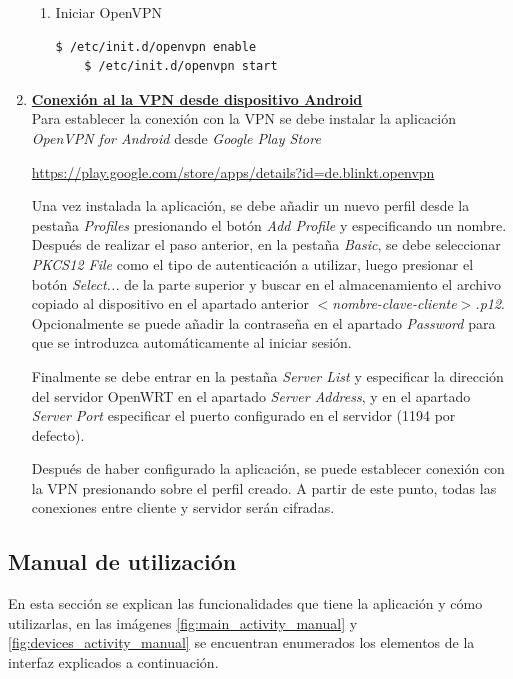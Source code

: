 \documentclass[12pt]{article}
\begin{document}
\begin{enumerate}
\begin{enumerate}
                        \item Iniciar OpenVPN
                        \begin{lstlisting}[language=bash]
    $ /etc/init.d/openvpn enable
    $ /etc/init.d/openvpn start
                        \end{lstlisting}
                    \end{enumerate}

                \item \textbf{\underline{Conexión al la VPN desde dispositivo Android}} \\
                Para establecer la conexión con la VPN se debe instalar la aplicación \textit{OpenVPN for Android} desde \textit{Google Play Store}
                
                \url{https://play.google.com/store/apps/details?id=de.blinkt.openvpn}

                Una vez instalada la aplicación, se debe añadir un nuevo perfil desde la pestaña \textit{Profiles} presionando el botón \textit{Add Profile} y especificando un nombre. Después de realizar el paso anterior, en la pestaña \textit{Basic}, se debe seleccionar \textit{PKCS12 File} como el tipo de autenticación a utilizar, luego presionar el botón \textit{Select...} de la parte superior y buscar en el almacenamiento el archivo copiado al dispositivo en el apartado anterior \textit{$<$nombre-clave-cliente$>$.p12}. Opcionalmente se puede añadir la contraseña en el apartado \textit{Password} para que se introduzca automáticamente al iniciar sesión.

                Finalmente se debe entrar en la pestaña \textit{Server List} y especificar la dirección del servidor OpenWRT en el apartado \textit{Server Address}, y en el apartado \textit{Server Port} especificar el puerto configurado en el servidor (1194 por defecto).

                Después de haber configurado la aplicación, se puede establecer conexión con la VPN presionando sobre el perfil creado. A partir de este punto, todas las conexiones entre cliente y servidor serán cifradas.
            \end{enumerate}

    \subsection{Manual de utilización}
        En esta sección se explican las funcionalidades que tiene la aplicación y cómo utilizarlas, en las imágenes \ref{fig:main_activity_manual} y \ref{fig:devices_activity_manual} se encuentran enumerados los elementos de la interfaz explicados a continuación.
\end{document}
